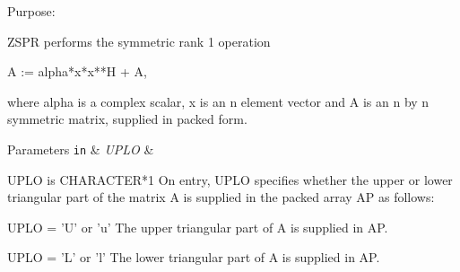  \begin{DoxyParagraph}{Purpose\+: }
\begin{DoxyVerb} ZSPR    performs the symmetric rank 1 operation

    A := alpha*x*x**H + A,

 where alpha is a complex scalar, x is an n element vector and A is an
 n by n symmetric matrix, supplied in packed form.\end{DoxyVerb}
 
\end{DoxyParagraph}

\begin{DoxyParams}[1]{Parameters}
\mbox{\tt in}  & {\em U\+P\+L\+O} & \begin{DoxyVerb}          UPLO is CHARACTER*1
           On entry, UPLO specifies whether the upper or lower
           triangular part of the matrix A is supplied in the packed
           array AP as follows:

              UPLO = 'U' or 'u'   The upper triangular part of A is
                                  supplied in AP.

              UPLO = 'L' or 'l'   The lower triangular part of A is
                                  supplied in AP.


\end{DoxyVerb}
\end{DoxyParams}
